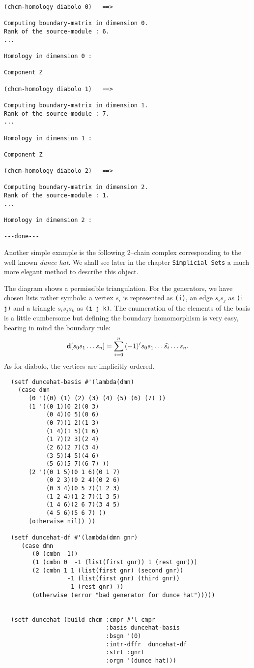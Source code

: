 {\footnotesize\begin{verbatim}
(chcm-homology diabolo 0)   ==>

Computing boundary-matrix in dimension 0.
Rank of the source-module : 6.
...

Homology in dimension 0 :

Component Z

(chcm-homology diabolo 1)   ==>

Computing boundary-matrix in dimension 1.
Rank of the source-module : 7.
...

Homology in dimension 1 :

Component Z

(chcm-homology diabolo 2)   ==>

Computing boundary-matrix in dimension 2.
Rank of the source-module : 1.
...

Homology in dimension 2 :

---done---
\end{verbatim}}
Another simple example is the following  2--chain  complex  corresponding to the
well known {\em dunce hat}. We shall see later in the chapter {\tt Simplicial Sets} a
much more elegant method to describe this object.
%
\vskip 0.40cm
\centerline{}
\vskip 0.40cm
%
The diagram shows a permissible triangulation. For the generators, we have  chosen lists 
rather symbols: a vertex $s_i$ is represented as {\tt (i)}, an edge $s_is_j$ as
{\tt (i j)} and a triangle $s_is_js_k$ as {\tt (i j k)}. The enumeration of
the elements of the basis is a little  cumbersome but defining  the
boundary homomorphism is very easy, bearing in mind the boundary rule:
$$ {\bf d}[s_0s_1\ldots s_n] = \sum_{i=0}^n{(-1)^is_0s_1\ldots\widehat{s_i}\ldots s_n}.$$
As for diabolo, the vertices are  implicitly ordered.
{\footnotesize\begin{verbatim}
  (setf duncehat-basis #'(lambda(dmn)
    (case dmn
       (0 '((0) (1) (2) (3) (4) (5) (6) (7) ))
       (1 '((0 1)(0 2)(0 3)
            (0 4)(0 5)(0 6)
            (0 7)(1 2)(1 3)
            (1 4)(1 5)(1 6)
            (1 7)(2 3)(2 4)
            (2 6)(2 7)(3 4)
            (3 5)(4 5)(4 6)
            (5 6)(5 7)(6 7) ))
       (2 '((0 1 5)(0 1 6)(0 1 7)
            (0 2 3)(0 2 4)(0 2 6)
            (0 3 4)(0 5 7)(1 2 3)
            (1 2 4)(1 2 7)(1 3 5)
            (1 4 6)(2 6 7)(3 4 5)
            (4 5 6)(5 6 7) ))
       (otherwise nil)) ))

  (setf duncehat-df #'(lambda(dmn gnr)
     (case dmn
        (0 (cmbn -1))
        (1 (cmbn 0  -1 (list(first gnr)) 1 (rest gnr)))
        (2 (cmbn 1 1 (list(first gnr) (second gnr))
                  -1 (list(first gnr) (third gnr))
                   1 (rest gnr) ))
        (otherwise (error "bad generator for dunce hat")))))


  (setf duncehat (build-chcm :cmpr #'l-cmpr
                             :basis duncehat-basis
                             :bsgn '(0)
                             :intr-dffr  duncehat-df
                             :strt :gnrt
                             :orgn '(dunce hat)))
\end{verbatim}}
